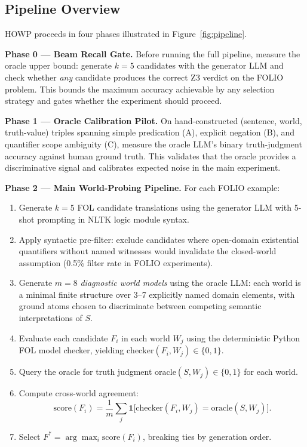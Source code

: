 \documentclass[11pt,letterpaper]{article}
\begin{document}
\subsection{Pipeline Overview}

HOWP proceeds in four phases illustrated in Figure~\ref{fig:pipeline}.

\textbf{Phase 0 --- Beam Recall Gate.} Before running the full pipeline, measure the oracle upper bound: generate $k{=}5$ candidates with the generator LLM and check whether \emph{any} candidate produces the correct Z3 verdict on the FOLIO problem. This bounds the maximum accuracy achievable by any selection strategy and gates whether the experiment should proceed.

\textbf{Phase 1 --- Oracle Calibration Pilot.} On hand-constructed (sentence, world, truth-value) triples spanning simple predication (A), explicit negation (B), and quantifier scope ambiguity (C), measure the oracle LLM's binary truth-judgment accuracy against human ground truth. This validates that the oracle provides a discriminative signal and calibrates expected noise in the main experiment.

\textbf{Phase 2 --- Main World-Probing Pipeline.} For each FOLIO example:
\begin{enumerate}
  \item Generate $k{=}5$ FOL candidate translations using the generator LLM with 5-shot prompting in NLTK logic module syntax.
  \item Apply syntactic pre-filter: exclude candidates where open-domain existential quantifiers without named witnesses would invalidate the closed-world assumption (0.5\% filter rate in FOLIO experiments).
  \item Generate $m{=}8$ \emph{diagnostic world models} using the oracle LLM: each world is a minimal finite structure over 3--7 explicitly named domain elements, with ground atoms chosen to discriminate between competing semantic interpretations of $S$.
  \item Evaluate each candidate $F_i$ in each world $W_j$ using the deterministic Python FOL model checker, yielding $\text{checker}(F_i, W_j) \in \{0,1\}$.
  \item Query the oracle for truth judgment $\text{oracle}(S, W_j) \in \{0,1\}$ for each world.
  \item Compute cross-world agreement:
  \[
    \text{score}(F_i) = \frac{1}{m}\sum_j \mathbf{1}\bigl[\text{checker}(F_i, W_j) = \text{oracle}(S, W_j)\bigr].
  \]
  \item Select $F^* = \arg\max_i \text{score}(F_i)$, breaking ties by generation order.
\end{enumerate}
\end{document}
